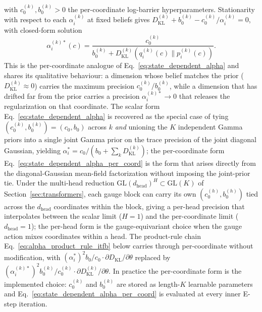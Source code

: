 \documentclass[11pt]{article}
\begin{document}
with $c_0^{(k)}, b_0^{(k)} > 0$ the per-coordinate log-barrier hyperparameters. Stationarity with respect to each $\alpha_i^{(k)}$ at fixed beliefs gives $D_{\mathrm{KL}}^{(k)} + b_0^{(k)} - c_0^{(k)}/\alpha_i^{(k)} = 0$, with closed-form solution
\begin{equation}
\boxed{
\alpha_i^{(k)*}(c) = \frac{c_0^{(k)}}{b_0^{(k)} + D_{\mathrm{KL}}^{(k)}(q_i^{(k)}(c) \| p_i^{(k)}(c))}.
}
\label{eq:state_dependent_alpha_per_coord}
\end{equation}
This is the per-coordinate analogue of Eq.~\eqref{eq:state_dependent_alpha} and shares its qualitative behaviour: a dimension whose belief matches the prior ($D_{\mathrm{KL}}^{(k)} \approx 0$) carries the maximum precision $c_0^{(k)}/b_0^{(k)}$, while a dimension that has drifted far from the prior carries a precision $\alpha_i^{(k)*} \to 0$ that releases the regularization on that coordinate. The scalar form Eq.~\eqref{eq:state_dependent_alpha} is recovered as the special case of tying $(c_0^{(k)}, b_0^{(k)}) = (c_0, b_0)$ across $k$ \emph{and} unioning the $K$ independent Gamma priors into a single joint Gamma prior on the trace precision of the joint diagonal Gaussian, yielding $\alpha_i^* = c_0 / (b_0 + \sum_k D_{\mathrm{KL}}^{(k)})$; the per-coordinate form Eq.~\eqref{eq:state_dependent_alpha_per_coord} is the form that arises directly from the diagonal-Gaussian mean-field factorization without imposing the joint-prior tie. Under the multi-head reduction $\mathrm{GL}(d_{\text{head}})^H \subset \mathrm{GL}(K)$ of Section~\ref{sec:transformers}, each gauge block can carry its own $(c_0^{(h)}, b_0^{(h)})$ tied across the $d_{\text{head}}$ coordinates within the block, giving a per-head precision that interpolates between the scalar limit ($H = 1$) and the per-coordinate limit ($d_{\text{head}} = 1$); the per-head form is the gauge-equivariant choice when the gauge action mixes coordinates within a head. The product-rule chain Eq.~\eqref{eq:alpha_product_rule_itfb} below carries through per-coordinate without modification, with $(\alpha_i^*)^2 b_0/c_0 \cdot \partial D_{\mathrm{KL}}/\partial\theta$ replaced by $(\alpha_i^{(k)*})^2 b_0^{(k)}/c_0^{(k)} \cdot \partial D_{\mathrm{KL}}^{(k)}/\partial\theta$. In practice the per-coordinate form is the implemented choice: $c_0^{(k)}$ and $b_0^{(k)}$ are stored as length-$K$ learnable parameters and Eq.~\eqref{eq:state_dependent_alpha_per_coord} is evaluated at every inner E-step iteration.
\end{document}
